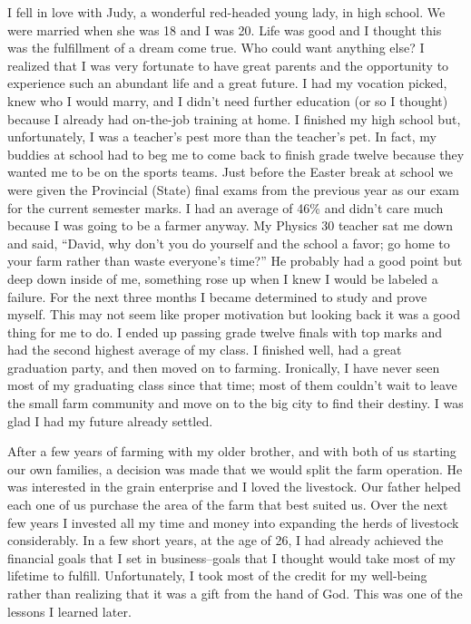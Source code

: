 \documentclass[twoside, 12pt]{book}
\begin{document}
I fell in love with Judy, a wonderful red-headed young lady, in high school. We were married when she was 18 and I was 20. Life was good and I thought this was the fulfillment of a dream come true. Who could want anything else? I realized that I was very fortunate to have great parents and the opportunity to experience such an abundant life and a great future. I had my vocation picked, knew who I would marry, and I didn't need further education (or so I thought) because I already had on-the-job training at home. I finished my high school but, unfortunately, I was a teacher's pest more than the teacher's pet. In fact, my buddies at school had to beg me to come back to finish grade twelve because they wanted me to be on the sports teams. Just before the Easter break at school we were given the Provincial (State) final exams from the previous year as our exam for the current semester marks. I had an average of 46\% and didn't care much because I was going to be a farmer anyway. My Physics 30 teacher sat me down and said, “David, why don't you do yourself and the school a favor; go home to your farm rather than waste everyone's time?” He probably had a good point but deep down inside of me, something rose up when I knew I would be labeled a failure. For the next three months I became determined to study and prove myself. This may not seem like proper motivation but looking back it was a good thing for me to do. I ended up passing grade twelve finals with top marks and had the second highest average of my class. I finished well, had a great graduation party, and then moved on to farming. Ironically, I have never seen most of my graduating class since that time; most of them couldn't wait to leave the small farm community and move on to the big city to find their destiny. I was glad I had my future already settled.

After a few years of farming with my older brother, and with both of us starting our own families, a decision was made that we would split the farm operation. He was interested in the grain enterprise and I loved the livestock. Our father helped each one of us purchase the area of the farm that best suited us. Over the next few years I invested all my time and money into expanding the herds of livestock considerably. In a few short years, at the age of 26, I had already achieved the financial goals that I set in business--goals that I thought would take most of my lifetime to fulfill. Unfortunately, I took most of the credit for my well-being rather than realizing that it was a gift from the hand of God. This was one of the lessons I learned later. 
\end{document}
